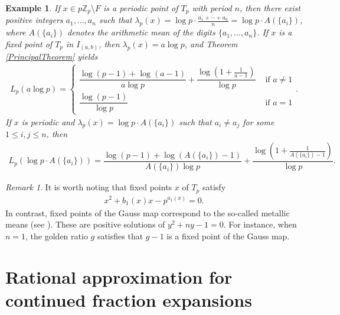 \documentclass[11pt]{amsart}
\newtheorem{example}{Example}
\theoremstyle{remark}
\newtheorem{remark}[theorem]{Remark}
\numberwithin{equation}{section}
\newcommand{\Z}{\mathbb{Z}}
\begin{document}
\begin{example}
    If $x\in p\Z_p \setminus F$ is a periodic point of $T_{p}$ with period $n$, then there exist positive integers $a_{1},...,a_{n}$ such that $\lambda_{p}(x)=\log p\cdot \frac{a_{1}+\cdots +a_{n}}{n}=\log p\cdot A(\{a_{i}\})$, where $A(\{a_{i}\})$ denotes the arithmetic mean of the digits $\{a_{1},...,a_{n}\}$. 
If $x$ is a fixed point of $T_{p}$ in $I_{(a,b)}$, then $\lambda_{p}(x)=a\log p$, and Theorem \ref{PrincipalTheorem} yields
\begin{align*}
        L_{p}(a\log p)=\begin{cases}
            \dfrac{\log(p-1)+\log(a-1)}{a\log p}+\dfrac{\log\left(1+\frac{1}{a-1}\right)}{\log p} & \text{ if $a\neq 1$}\\
            \dfrac{\log(p-1)}{\log p} & \text{ if $a=1$}
        \end{cases}.
    \end{align*}If $x$ is periodic and $\lambda_{p}(x)=\log p\cdot A(\{a_{i}\})$ such that $a_{i}\neq a_{j}$ for some $1\leq i,j\leq n$, then
    \begin{align*}
        L_{p}\left(\log p\cdot A(\{a_{i}\})\right)= \dfrac{\log(p-1)+\log(A(\{a_{i}\})-1)}{A(\{a_{i}\})\log p}+\dfrac{\log\left(1+\frac{1}{A(\{a_{i}\})-1}\right)}{\log p}.
    \end{align*}
\end{example}
\begin{remark}
     It is worth noting that fixed points $x$ of $T_{p}$ satisfy 
    \begin{align}\label{PetalicNumbers}
        x^{2}+b_{1}(x)x-p^{a_{1}(x)}=0.
    \end{align} In contrast, fixed points of the Gauss map correspond to the so-called metallic means (see \cite{ds}). These are positive solutions of $y^{2}+ny-1=0$. For instance, when $n=1$, the golden ratio $g$ satisfies that $g-1$ is a fixed point of the Gauss map.
\end{remark}

\section{Rational approximation for continued fraction expansions}\label{geompotential}
\end{document}
